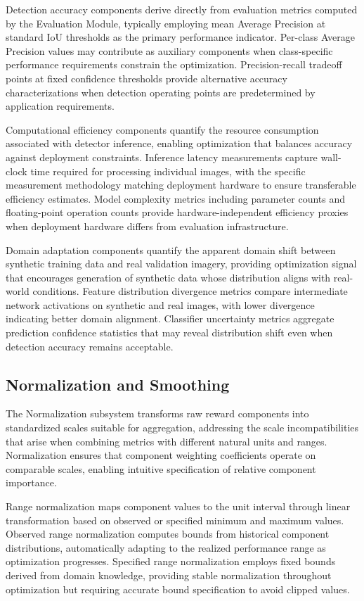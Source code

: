 Detection accuracy components derive directly from evaluation metrics computed by the Evaluation Module, typically employing mean Average Precision at standard IoU thresholds as the primary performance indicator. Per-class Average Precision values may contribute as auxiliary components when class-specific performance requirements constrain the optimization. Precision-recall tradeoff points at fixed confidence thresholds provide alternative accuracy characterizations when detection operating points are predetermined by application requirements.

Computational efficiency components quantify the resource consumption associated with detector inference, enabling optimization that balances accuracy against deployment constraints. Inference latency measurements capture wall-clock time required for processing individual images, with the specific measurement methodology matching deployment hardware to ensure transferable efficiency estimates. Model complexity metrics including parameter counts and floating-point operation counts provide hardware-independent efficiency proxies when deployment hardware differs from evaluation infrastructure.

Domain adaptation components quantify the apparent domain shift between synthetic training data and real validation imagery, providing optimization signal that encourages generation of synthetic data whose distribution aligns with real-world conditions. Feature distribution divergence metrics compare intermediate network activations on synthetic and real images, with lower divergence indicating better domain alignment. Classifier uncertainty metrics aggregate prediction confidence statistics that may reveal distribution shift even when detection accuracy remains acceptable.

\subsection{Normalization and Smoothing}

The Normalization subsystem transforms raw reward components into standardized scales suitable for aggregation, addressing the scale incompatibilities that arise when combining metrics with different natural units and ranges. Normalization ensures that component weighting coefficients operate on comparable scales, enabling intuitive specification of relative component importance.

Range normalization maps component values to the unit interval through linear transformation based on observed or specified minimum and maximum values. Observed range normalization computes bounds from historical component distributions, automatically adapting to the realized performance range as optimization progresses. Specified range normalization employs fixed bounds derived from domain knowledge, providing stable normalization throughout optimization but requiring accurate bound specification to avoid clipped values.

